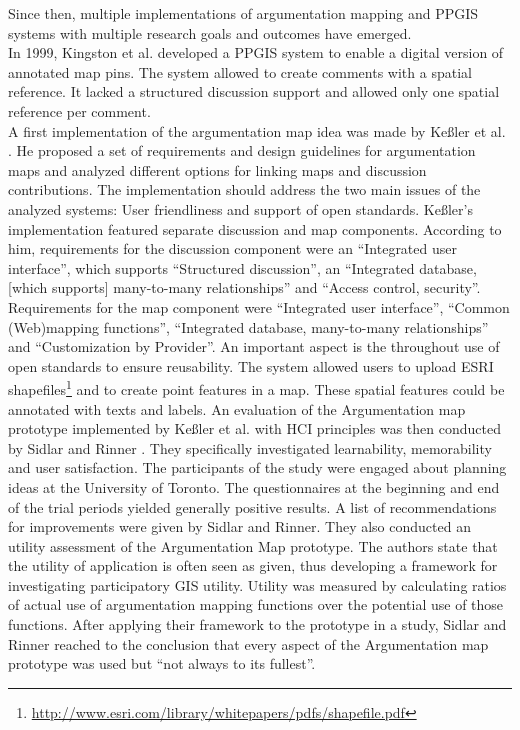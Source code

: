 Since then, multiple implementations of argumentation mapping and PPGIS systems with multiple research goals and outcomes have emerged.\\
In 1999, Kingston et al. \cite{kingston1999gis} developed a PPGIS system to enable a digital version of annotated map pins. The system allowed to create comments with a spatial reference. It lacked a structured discussion support and allowed only one spatial reference per comment.\\
A first implementation of the argumentation map idea was made by Ke{\ss}ler et al. \cite{Kessler2005_ArgumentationMapPrototype}. He proposed a set of requirements and design guidelines for argumentation maps and analyzed different options for linking maps and discussion contributions. The implementation should address the two main issues of the analyzed systems: User friendliness and support of open standards. Ke{\ss}ler's implementation featured separate discussion and map components. According to him, requirements for the discussion component were an ``Integrated user interface'', which supports ``Structured discussion'', an ``Integrated database, [which supports] many-to-many relationships'' and ``Access control, security''. Requirements for the map component were ``Integrated user interface'', ``Common (Web)mapping functions'', ``Integrated database, many-to-many relationships'' and ``Customization by Provider''. An important aspect is the throughout use of open standards to ensure reusability. The system allowed users to upload ESRI shapefiles\footnote{\url{http://www.esri.com/library/whitepapers/pdfs/shapefile.pdf}} and to create point features in a map. These spatial features could be annotated with texts and labels. An evaluation of the Argumentation map prototype implemented by Ke{\ss}ler et al. with HCI principles was then conducted by Sidlar and Rinner \cite{sidlar_argumap_2007}. They specifically investigated learnability, memorability and user satisfaction. The participants of the study were engaged about planning ideas at the University of Toronto. The questionnaires at the beginning and end of the trial periods yielded generally positive results. A list of recommendations for improvements were given by Sidlar and Rinner. They also conducted an utility assessment \cite{Sidlar2009-AssessmentMapGeocollaborationTool} of the Argumentation Map prototype. The authors state that the utility of application is often seen as given, thus developing a framework for investigating participatory GIS utility. Utility was measured by calculating ratios of actual use of argumentation mapping functions over the potential use of those functions. After applying their framework to the prototype in a study, Sidlar and Rinner reached to the conclusion that every aspect of the Argumentation map prototype was used but ``not always to its fullest''.\\
